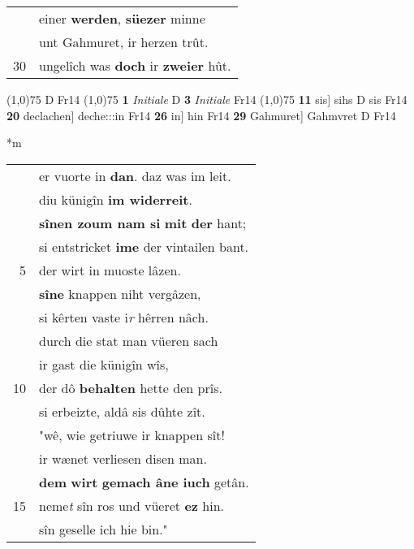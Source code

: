 \documentclass[8pt,a4paper,notitlepage]{article}
\begin{document}
\begin{table}[ht]
\begin{minipage}[t]{0.5\linewidth}
\begin{tabular}{rl}
 & einer \textbf{werden}, \textbf{süezer} minne\\ 
 & unt Gahmuret, ir herzen trût.\\ 
30 & ungelîch was \textbf{doch} ir \textbf{zweier} hût.\\ 
\end{tabular}
\scriptsize
\line(1,0){75} \newline
D Fr14 \newline
\line(1,0){75} \newline
\textbf{1} \textit{Initiale} D  \textbf{3} \textit{Initiale} Fr14  \newline
\line(1,0){75} \newline
\textbf{11} sis] sihs D sis Fr14 \textbf{20} declachen] deche:::in Fr14 \textbf{26} in] hin Fr14 \textbf{29} Gahmuret] Gahmvret D Fr14 \newline
\end{minipage}
\hspace{0.5cm}
\begin{minipage}[t]{0.5\linewidth}
\small
\begin{center}*m
\end{center}
\begin{tabular}{rl}
 & er vuorte in \textbf{dan}. daz was im leit.\\ 
 & diu künigîn \textbf{im widerreit}.\\ 
 & \textbf{sînen zoum nam si} \textbf{mit} \textbf{der} hant;\\ 
 & si entstricket \textbf{ime} der vintailen bant.\\ 
5 & der wirt in muoste lâzen.\\ 
 & \textbf{sîne} knappen niht vergâzen,\\ 
 & si kêrten vaste i\textit{r} hêrren nâch.\\ 
 & durch die stat man vüeren sach\\ 
 & ir gast die künigîn wîs,\\ 
10 & der dô \textbf{behalten} hette den prîs.\\ 
 & si erbeizte, aldâ sis dûhte zît.\\ 
 & "wê, wie getriuwe ir knappen sît!\\ 
 & ir wænet verliesen disen man.\\ 
 & \textbf{dem} \textbf{wirt} \textbf{gemach âne iuch} getân.\\ 
15 & neme\textit{t} sîn ros und vüeret \textbf{ez} hin.\\ 
 & sîn geselle ich hie bin."\\ 

\end{tabular}
\end{minipage}
\end{table}
\end{document}
